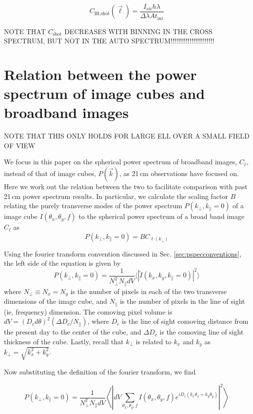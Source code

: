 \documentclass{emulateapj}
\newcommand{\IR}{\text{IR}}
\newcommand{\shot}{\text{shot}}
\begin{document}
\begin{equation}
C_{\IR, \shot}(\vec{\ell}) =\frac{I_\text{air}h\lambda}{\Delta \lambda A t_\text{int}}
\end{equation}

NOTE THAT $C_\shot$ DECREASES WITH BINNING IN THE CROSS SPECTRUM, BUT NOT IN THE AUTO SPECTRUM!!!!!!!!!!!!!!!!!!!!!!!

\section{Relation between the power spectrum of image cubes and broadband images}
\label{sec:pspecrelation}

NOTE THAT THIS ONLY HOLDS FOR LARGE ELL OVER A SMALL FIELD OF VIEW

We focus in this paper on the spherical power spectrum of broadband images, $C_\ell$,  instead of that of image cubes, $P(\vec{k})$, as 21\,cm observations have focused on. Here we work out the relation between the two to facilitate comparison with past 21\,cm power spectrum results. In particular, we calculate the scaling factor $B$ relating the purely transverse modes of the power spectrum $P(k_\perp,k_\parallel=0)$ of a image cube $I(\theta_x,\theta_y,f)$ to the spherical power spectrum of a broad band image $C_\ell$ as
\begin{equation}
P(k_\perp,k_\parallel=0) = B C_{\ell(k_\perp)}
\end{equation}

Using the fourier transform convention discussed in Sec. \ref{sec:pspecconventions}, the left side of the equation is given by
\begin{equation}
P(k_\perp,k_\parallel=0) = \frac{1}{N_\perp^2 N_\parallel dV}\langle|\tilde{I}(k_x,k_y,k_\parallel=0)|^2\rangle
\end{equation}
where $N_\perp\equiv N_x=N_y$ is the number of pixels in each of the two transverse dimensions of the image cube, and $N_\parallel$ is the number of pixels in the line of sight (ie, frequency) dimension. The comoving pixel volume is $dV = (D_c d\theta)^2 (\Delta D_c/N_\parallel)$, where $D_c$ is the line of sight comoving distance from the present day to the center of the cube, and $\Delta D_c$ is the comoving line of sight thickness of the cube. Lastly, recall that $k_\perp$ is related to $k_x$ and $k_y$ as $k_\perp=\sqrt{k_x^2+k_y^2}$.

Now substituting the definition of the fourier transform, we find

\begin{equation}
P(k_\perp,k_\parallel=0) =\frac{1}{N_\perp^2 N_\parallel dV}\left\langle\left|dV\sum_{\theta_x,\theta_y,f}I(\theta_x,\theta_y,f)e^{iD_c(k_x\theta_x+k_y\theta_y)}\right|^2\right\rangle
\end{equation}
\end{document}
